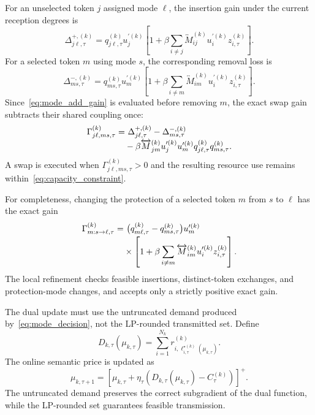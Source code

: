 \documentclass[journal]{IEEEtran}
\begin{document}
For an unselected token $j$ assigned mode $\ell$, the insertion gain under the current reception degrees is
\begin{equation}
\Delta_{j\ell,\tau}^{+,(k)}
=q_{j\ell,\tau}^{(k)}u_j^{\prime(k)}
\left[1+\beta\sum_{i\neq j}\overleftrightarrow M_{ij}^{(k)}u_i^{\prime(k)}z_{i,\tau}^{(k)}\right].
\label{eq:mode_add_gain}
\end{equation}
For a selected token $m$ using mode $s$, the corresponding removal loss is
\begin{equation}
\Delta_{ms,\tau}^{-,(k)}
=q_{ms,\tau}^{(k)}u_m^{\prime(k)}
\left[1+\beta\sum_{i\neq m}\overleftrightarrow M_{im}^{(k)}u_i^{\prime(k)}z_{i,\tau}^{(k)}\right].
\label{eq:mode_remove_loss}
\end{equation}
Since~\eqref{eq:mode_add_gain} is evaluated before removing $m$, the exact swap gain subtracts their shared coupling once:
\begin{align}
\Gamma_{j\ell,ms,\tau}^{(k)}
=&~\Delta_{j\ell,\tau}^{+,(k)}-\Delta_{ms,\tau}^{-,(k)}
\notag\\[-0.2em]
&-\beta\overleftrightarrow M_{jm}^{(k)}u_j^{\prime(k)}u_m^{\prime(k)}
q_{j\ell,\tau}^{(k)}q_{ms,\tau}^{(k)}.
\label{eq:exact_swap_gain}
\end{align}
A swap is executed when $\Gamma_{j\ell,ms,\tau}^{(k)}>0$ and the resulting resource use remains within~\eqref{eq:capacity_constraint}.

For completeness, changing the protection of a selected token $m$ from $s$ to $\ell$ has the exact gain
\begin{align}
\Gamma_{m:s\rightarrow\ell,\tau}^{(k)}
=&~\big(q_{m\ell,\tau}^{(k)}-q_{ms,\tau}^{(k)}\big)u_m^{\prime(k)}
\notag\\[-0.2em]
&\times\left[1+\beta\sum_{i\neq m}\overleftrightarrow M_{im}^{(k)}u_i^{\prime(k)}z_{i,\tau}^{(k)}\right].
\label{eq:mode_change_gain}
\end{align}
The local refinement checks feasible insertions, distinct-token exchanges, and protection-mode changes, and accepts only a strictly positive exact gain.

The dual update must use the untruncated demand produced by~\eqref{eq:mode_decision}, not the LP-rounded transmitted set. Define
\begin{equation}
D_{k,\tau}(\mu_{k,\tau})
=\sum_{i=1}^{N_k}
r_{i,\ell_{i,\tau}^{\star(k)}(\mu_{k,\tau})}^{(k)}.
\label{eq:untruncated_demand}
\end{equation}
The online semantic price is updated as
\begin{equation}
\mu_{k,\tau+1}
=\left[\mu_{k,\tau}
+\eta_{\tau}\left(D_{k,\tau}(\mu_{k,\tau})-C_{\tau}^{(k)}\right)\right]^+.
\label{eq:dual_update}
\end{equation}
The untruncated demand preserves the correct subgradient of the dual function, while the LP-rounded set guarantees feasible transmission.
\end{document}
